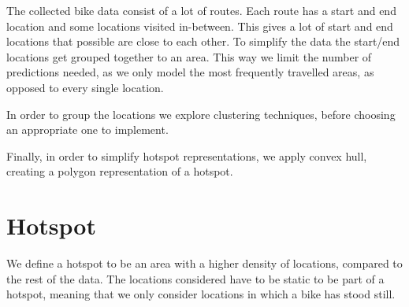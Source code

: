 The collected bike data consist of a lot of routes.
Each route has a start and end location and some locations visited in-between.
This gives a lot of start and end locations that possible are close to each other.
To simplify the data the start/end locations get grouped together to an area.
This way we limit the number of predictions needed, as we only model the most frequently travelled areas, as opposed to every single location.

In order to group the locations we explore clustering techniques, before choosing an appropriate one to implement.

Finally, in order to simplify hotspot representations, we apply convex hull, creating a polygon representation of a hotspot.

\section{Hotspot}\label{hotspot}
We define a hotspot to be an area with a higher density of locations, compared to the rest of the data. The locations considered have to be static to be part of a hotspot, meaning that we only consider locations in which a bike has stood still.
